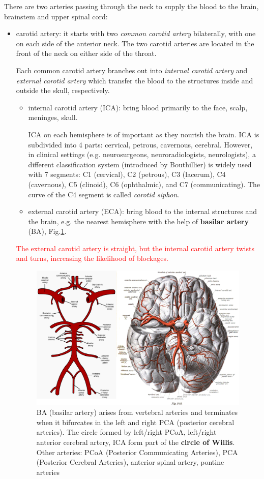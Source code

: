There are two arteries passing through the neck to supply the blood to the
brain, brainstem and upper spinal cord:
\begin{itemize}
  \item carotid artery: it starts with two {\it common carotid artery}
  bilaterally, with one on each side of the anterior neck. The two carotid arteries are
  located in the front of the neck on either side of the throat.

  Each common carotid artery branches out into {\it internal carotid artery} and
  {\it external carotid artery} which transfer the blood to the structures
  inside and outside the skull, respectively.
  \begin{itemize}
    \item internal carotid artery (ICA):  bring blood primarily to the face,
    scalp, meninges, skull.

    ICA on each hemisphere is of important as they nourish the brain. ICA is
    subdivided into 4 parts:    cervical, petrous, cavernous, cerebral. However,
    in clinical settings (e.g. neurosurgeons, neuroradiologists, neurologists),
    a different classification system (introduced by Bouthillier) is widely used
    with 7 segments: C1 (cervical), C2 (petrous), C3 (lacerum), C4 (cavernous),
    C5 (clinoid), C6 (ophthalmic), and C7 (communicating). The curve of the C4
    segment is called {\it carotid siphon}.


    \item external carotid artery (ECA): bring blood to the internal
    structures and the brain, e.g. the nearest hemisphere with the help of {\bf
    basilar artery} (BA), Fig.\ref{fig:BA_VA_arteries}.
  \end{itemize}
  \textcolor{red}{The external carotid artery is straight, but the internal
  carotid artery twists and turns, increasing the likelihood of blockages.}

\begin{figure}[hbt]
\centerline{\includegraphics[height=7cm,
    angle=0]{./images/BA_VA_arteries.eps}}
\caption{BA (basilar artery) arises from vertebral arteries and terminates when
it bifurcates in the left and right PCA (posterior cerebral arteries). The
circle formed by left/right PCoA, left/right anterior cerebral artery, ICA form
part of the {\bf circle of Willis}. Other
arteries: PCoA (Posterior Communicating Arteries), PCA (Posterior Cerebral
Arteries), anterior spinal artery, pontine arteries}
\label{fig:BA_VA_arteries}
\end{figure}


\end{itemize}
